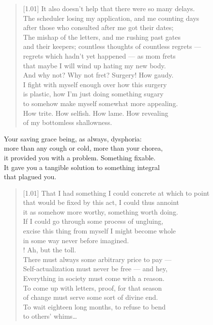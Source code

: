 \begin{verse}[1.01\textwidth]
  It also doesn't help that there were so many delays.\\
  The scheduler losing my application, and me counting days\\
  after those who consulted after me got their dates;\\
  The mishap of the letters, and me rushing past gates\\
  and their keepers; countless thoughts of countless regrets ---\\
  regrets which hadn't yet happened --- as mom frets\\
  that maybe I will wind up hating my new body.\\
  And why not? Why not fret? Surgery! How gaudy.\\
  I fight with myself enough over how this surgery\\
  is plastic, how I'm just doing something sugary\\
  to somehow make myself somewhat more appealing.\\
  How trite. How selfish. How lame. How revealing\\
  of my bottomless shallowness.
\end{verse}

\begin{ally}
  Your saving grace being, as always, dysphoria:\\
  \noindent more than any cough or cold, more than your chorea,\\
  \noindent it provided you with a problem. Something fixable.\\
  \noindent It gave you a tangible solution to something integral\\
  \noindent that plagued you.
\end{ally}

\begin{verse}[1.01\textwidth]
  That I had something I could concrete at which to point\\
  that would be fixed by this act, I could thus annoint\\
  it as somehow more worthy, something worth doing.\\
  If I could go through some process of ungluing,\\
  excise this thing from myself I might become whole\\
  in some way never before imagined.\\!
   Ah, but the toll.\\
  There must always some arbitrary price to pay ---\\
  Self-actualization must never be free --- and hey,\\
  Everything in society must come with a reason.\\
  To come up with letters, proof, for that season\\
  of change must serve some sort of divine end.\\
  To wait eighteen long months, to refuse to bend\\
  to others' whims\ldots{}
\end{verse}

